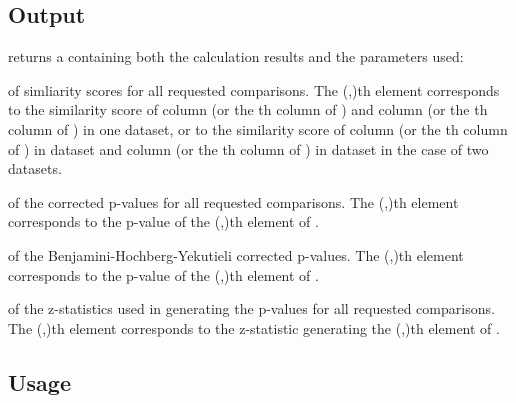 \documentclass{article}\usepackage[]{graphicx}\usepackage[usenames,dvipsnames]{color}
\begin{document}
\subsection{Output}

 returns a  containing both the calculation results and the parameters used:

\begin{description}
\setlength{\itemsep}{1em}

\item[\Rcode{sim.score}]
 of simliarity scores for all requested comparisons.  The (,)th element corresponds to the similarity score of column  (or the th column of ) and column  (or the th column of ) in one dataset, or to the similarity score of column  (or the th column of ) in dataset  and column  (or the th column of ) in dataset  in the case of two datasets.

\item[\Rcode{p.values}]
 of the corrected p-values for all requested comparisons.  The (,)th element corresponds to the p-value of the (,)th element of .

\item[\Rcode{q.values}]
 of the Benjamini-Hochberg-Yekutieli corrected p-values.  The (,)th element corresponds to the p-value of the (,)th element of .

\item[\Rcode{z.stat}]
   of the z-statistics used in generating the p-values for all requested comparisons.  The (,)th element corresponds to the z-statistic generating the (,)th element of .

\end{description}

\subsection{Usage}	
\end{document}
